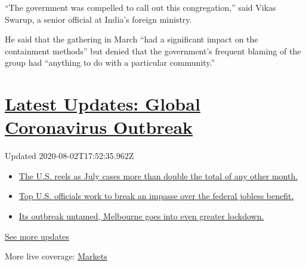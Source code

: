 ``The government was compelled to call out this congregation,'' said
Vikas Swarup, a senior official at India's foreign ministry.

He said that the gathering in March ``had a significant impact on the
containment methods'' but denied that the government's frequent blaming
of the group had ``anything to do with a particular community.''

\hypertarget{latest-updates-global-coronavirus-outbreak}{%
\section{\texorpdfstring{\href{https://www.nytimes.com/2020/08/01/world/coronavirus-covid-19.html?action=click\&pgtype=Article\&state=default\&region=MAIN_CONTENT_1\&context=storylines_live_updates}{Latest
Updates: Global Coronavirus
Outbreak}}{Latest Updates: Global Coronavirus Outbreak}}\label{latest-updates-global-coronavirus-outbreak}}

Updated 2020-08-02T17:52:35.962Z

\begin{itemize}
\tightlist
\item
  \href{https://www.nytimes.com/2020/08/01/world/coronavirus-covid-19.html?action=click\&pgtype=Article\&state=default\&region=MAIN_CONTENT_1\&context=storylines_live_updates\#link-34047410}{The
  U.S. reels as July cases more than double the total of any other
  month.}
\item
  \href{https://www.nytimes.com/2020/08/01/world/coronavirus-covid-19.html?action=click\&pgtype=Article\&state=default\&region=MAIN_CONTENT_1\&context=storylines_live_updates\#link-780ec966}{Top
  U.S. officials work to break an impasse over the federal jobless
  benefit.}
\item
  \href{https://www.nytimes.com/2020/08/01/world/coronavirus-covid-19.html?action=click\&pgtype=Article\&state=default\&region=MAIN_CONTENT_1\&context=storylines_live_updates\#link-2bc8948}{Its
  outbreak untamed, Melbourne goes into even greater lockdown.}
\end{itemize}

\href{https://www.nytimes.com/2020/08/01/world/coronavirus-covid-19.html?action=click\&pgtype=Article\&state=default\&region=MAIN_CONTENT_1\&context=storylines_live_updates}{See
more updates}

More live coverage:
\href{https://www.nytimes.com/live/2020/07/31/business/stock-market-today-coronavirus?action=click\&pgtype=Article\&state=default\&region=MAIN_CONTENT_1\&context=storylines_live_updates}{Markets}

